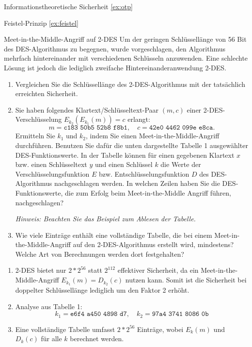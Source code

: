 \documentclass{article}
\begin{document}
\setcounter{subsection}{30}
\begin{exercise}{Informationstheoretische Sicherheit \ref{ex:otp}}\end{exercise}

\begin{exercise}{Feistel-Prinzip \ref{ex:feistel}}\end{exercise}

\begin{exercise}{Meet-in-the-Middle-Angriff auf 2-DES}
  Um der geringen Schlüssellänge von 56 Bit des DES-Algorithmus zu begegnen, wurde vorgeschlagen, den Algorithmus mehrfach hintereinander mit verschiedenen Schlüsseln anzuwenden. Eine schlechte Lösung ist jedoch die lediglich zweifache Hintereinanderanwendung 2-DES.
  \begin{enumerate}
    \item Vergleichen Sie die Schlüssellänge des 2-DES-Algorithmus mit der tatsächlich erreichten Sicherheit.
    \item Sie haben folgendes Klartext/Schlüsseltext-Paar $ (m, c) $ einer 2-DES-Verschlüsselung $ E_{k_2}(E_{k_1}(m)) = c $ erlangt: 
      \[ m = \texttt{c183 50b5 52b8 f8b1}, \quad c = \texttt{42e0 4462 099e e8ca}. \]
      Ermitteln Sie $ k_1 $ und $ k_2 $, indem Sie einen Meet-in-the-Middle-Angriff durchführen. Benutzen Sie dafür die unten dargestellte Tabelle 1 ausgewählter DES-Funktionswerte. In der Tabelle können für einen gegebenen Klartext $ x $ bzw. einen Schlüsseltext $ y $ und einen Schlüssel $ k $ die Werte der Verschlüsselungsfunktion $ E $ bzw. Entschlüsselungsfunktion $ D $ des DES-Algorithmus nachgeschlagen werden. In welchen Zeilen haben Sie die DES-Funktionswerte, die zum Erfolg beim Meet-in-the-Middle Angriff führen, nachgeschlagen?
      \par\textit{Hinweis: Beachten Sie das Beispiel zum Ablesen der Tabelle.}
      
    \item Wie viele Einträge enthält eine vollständige Tabelle, die bei einem Meet-in-the-Middle-Angriff auf den 2-DES-Algorithmus erstellt wird, mindestens? Welche Art von Berechnungen werden dort festgehalten?
  \end{enumerate}

  \begin{solution}
    \begin{enumerate}
        \item 2-DES bietet nur $2*2^{56}$ statt $2^{112}$ effektiver Sicherheit, da ein Meet-in-the-Middle-Angriff $E_{k_1}(m) = D_{k_2}(c)$ nutzen kann. Somit ist die Sicherheit bei doppelter Schlüssellänge lediglich um den Faktor 2 erhöht.
        \item Analyse aus Tabelle 1:
          \[  k_1 = \texttt{e6f4 a450 4898 d7}, \quad k_2 = \texttt{97a4 3741 8086 0b} \]
        \item Eine vollständige Tabelle umfasst $2*2^{56}$ Einträge, wobei $E_k(m)$ und $D_k(c)$ für alle $k$ berechnet werden.
    \end{enumerate}
  \end{solution}
\end{exercise}
\end{document}
